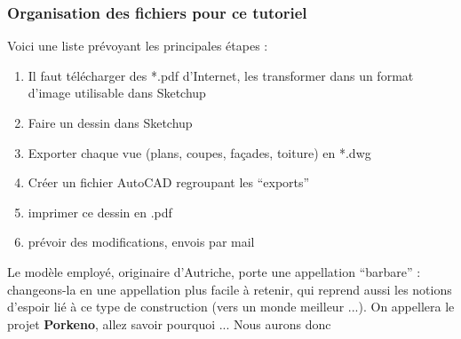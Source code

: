 \documentclass[a4paper,12pt,french]{sphinxmanual}
\begin{document}
\subsubsection{Organisation des fichiers pour ce tutoriel}
\label{init_su+acad/demarrage:organisation-des-fichiers-pour-ce-tutoriel}
Voici une liste prévoyant les principales étapes :
\begin{enumerate}
\item {} 
Il faut télécharger des *.pdf d'Internet, les transformer dans un format d'image utilisable dans Sketchup

\item {} 
Faire un dessin dans Sketchup

\item {} 
Exporter chaque vue (plans, coupes, façades, toiture) en *.dwg

\item {} 
Créer un fichier AutoCAD regroupant les ``exports''

\item {} 
imprimer ce dessin en .pdf

\item {} 
prévoir des modifications, envois par mail

\end{enumerate}

Le modèle employé, originaire d'Autriche, porte une appellation ``barbare'' :
changeons-la en une appellation plus facile à retenir, qui reprend aussi les
notions d'espoir lié à ce type de construction (vers un monde meilleur ...). On
appellera le projet \textbf{Porkeno}, allez savoir pourquoi ...
\label{init_su+acad/demarrage:arborescence-projet}
Nous aurons donc
\end{document}
